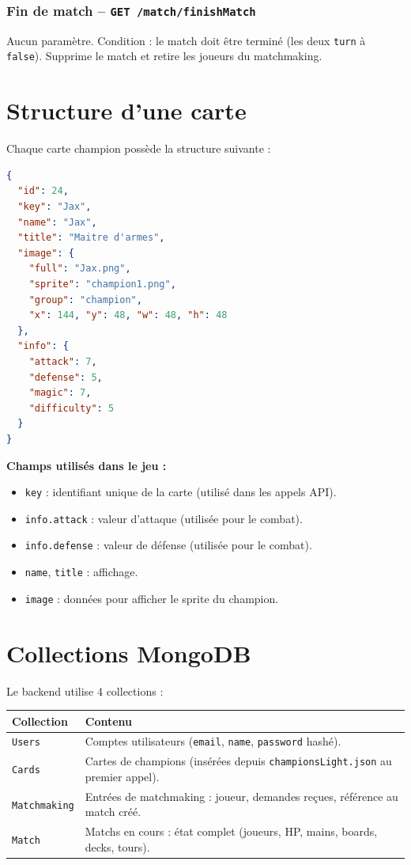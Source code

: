 \documentclass[12pt,a4paper]{article}
\begin{document}
\subsubsection{Fin de match -- \texttt{GET /match/finishMatch}}

Aucun paramètre. Condition : le match doit être terminé (les deux \texttt{turn} à \texttt{false}). Supprime le match et retire les joueurs du matchmaking.

\section{Structure d'une carte}

Chaque carte champion possède la structure suivante :

\begin{lstlisting}[language=json, title=Exemple : Jax]
{
  "id": 24,
  "key": "Jax",
  "name": "Jax",
  "title": "Maitre d'armes",
  "image": {
    "full": "Jax.png",
    "sprite": "champion1.png",
    "group": "champion",
    "x": 144, "y": 48, "w": 48, "h": 48
  },
  "info": {
    "attack": 7,
    "defense": 5,
    "magic": 7,
    "difficulty": 5
  }
}
\end{lstlisting}

\vspace{0.2cm}
\textbf{Champs utilisés dans le jeu :}
\begin{itemize}[noitemsep]
    \item \texttt{key} : identifiant unique de la carte (utilisé dans les appels API).
    \item \texttt{info.attack} : valeur d'attaque (utilisée pour le combat).
    \item \texttt{info.defense} : valeur de défense (utilisée pour le combat).
    \item \texttt{name}, \texttt{title} : affichage.
    \item \texttt{image} : données pour afficher le sprite du champion.
\end{itemize}

\section{Collections MongoDB}

Le backend utilise 4 collections :

\begin{tabularx}{\textwidth}{l X}
\toprule
\textbf{Collection} & \textbf{Contenu} \\
\midrule
\texttt{Users} & Comptes utilisateurs (\texttt{email}, \texttt{name}, \texttt{password} hashé). \\
\texttt{Cards} & Cartes de champions (insérées depuis \texttt{championsLight.json} au premier appel). \\
\texttt{Matchmaking} & Entrées de matchmaking : joueur, demandes reçues, référence au match créé. \\
\texttt{Match} & Matchs en cours : état complet (joueurs, HP, mains, boards, decks, tours). \\
\bottomrule
\end{tabularx}
\end{document}
